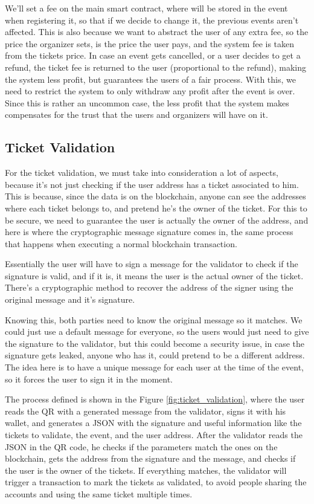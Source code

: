 We'll set a fee on the main smart contract, where will be stored in the event when registering it, so that if we decide to change it, the previous events aren't affected. This is also because we want to abstract the user of any extra fee, so the price the organizer sets, is the price the user pays, and the system fee is taken from the tickets price. In case an event gets cancelled, or a user decides to get a refund, the ticket fee is returned to the user (proportional to the refund), making the system less profit, but guarantees the users of a fair process. With this, we need to restrict the system to only withdraw any profit after the event is over. Since this is rather an uncommon case, the less profit that the system makes compensates for the trust that the users and organizers will have on it.

\subsection{Ticket Validation}
\label{subsec:ticket_validation}

For the ticket validation, we must take into consideration a lot of aspects, because it's not just checking if the user address has a ticket associated to him. This is because, since the data is on the blockchain, anyone can see the addresses where each ticket belongs to, and pretend he's the owner of the ticket. For this to be secure, we need to guarantee the user is actually the owner of the address, and here is where the cryptographic message signature comes in, the same process that happens when executing a normal blockchain transaction.

Essentially the user will have to sign a message for the validator to check if the signature is valid, and if it is, it means the user is the actual owner of the ticket. There's a cryptographic method to recover the address of the signer using the original message and it's signature.

Knowing this, both parties need to know the original message so it matches. We could just use a default message for everyone, so the users would just need to give the signature to the validator, but this could become a security issue, in case the signature gets leaked, anyone who has it, could pretend to be a different address. The idea here is to have a unique message for each user at the time of the event, so it forces the user to sign it in the moment.

The process defined is shown in the Figure \ref{fig:ticket_validation}, where the user reads the QR with a generated message from the validator, signs it with his wallet, and generates a JSON with the signature and useful information like the tickets to validate, the event, and the user address. After the validator reads the JSON in the QR code, he checks if the parameters match the ones on the blockchain, gets the address from the signature and the message, and checks if the user is the owner of the tickets. If everything matches, the validator will trigger a transaction to mark the tickets as validated, to avoid people sharing the accounts and using the same ticket multiple times.

